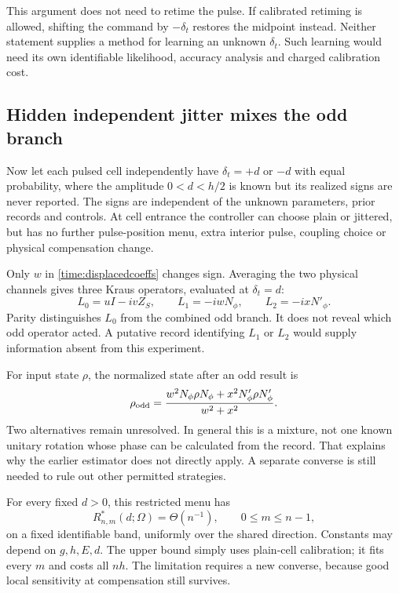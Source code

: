 \documentclass[11pt,a4paper]{article}
\numberwithin{equation}{section}
\theoremstyle{remark}
\begin{document}
This argument does not need to retime the pulse. If calibrated retiming is
allowed, shifting the command by $-\delta_t$ restores the midpoint instead.
Neither statement supplies a method for learning an unknown $\delta_t$.
Such learning would need its own identifiable likelihood, accuracy analysis
and charged calibration cost.

\subsection{Hidden independent jitter mixes the odd branch}

Now let each pulsed cell independently have $\delta_t=+d$ or $-d$ with equal
probability, where the amplitude $0<d<h/2$ is known but its realized signs are
never reported. The signs are independent of the unknown parameters, prior
records and controls. At cell entrance the controller can choose plain or
jittered, but has no further pulse-position menu, extra interior pulse,
coupling choice or physical compensation change.

Only $w$ in \eqref{time:displacedcoeffs} changes sign. Averaging the two
physical channels gives three Kraus operators, evaluated at $\delta_t=d$:
\begin{equation}
 L_0=uI-ivZ_S,\qquad L_1=-iwN_\phi,\qquad L_2=-ixN'_\phi.
 \label{time:jitterkraus}
\end{equation}
Parity distinguishes $L_0$ from the combined odd branch. It does not reveal
which odd operator acted. A putative record identifying $L_1$ or $L_2$ would
supply information absent from this experiment.

For input state $\rho$, the normalized state after an odd result is
\begin{equation}
 \rho_{\rm odd}=
 \frac{w^2N_\phi\rho N_\phi+x^2N'_\phi\rho N'_\phi}{w^2+x^2}.
\end{equation}
Two alternatives remain unresolved. In general this is a mixture, not one
known unitary rotation whose phase can be calculated from the record.
That explains why the earlier estimator does not directly apply. A separate
converse is still needed to rule out other permitted strategies.

For every fixed $d>0$, this restricted menu has
\begin{equation}
 R_{n,m}^{*}(d;\Omega)=\Theta(n^{-1}),
 \qquad 0\le m\le n-1,
 \label{time:jitterrisk}
\end{equation}
on a fixed identifiable band, uniformly over the shared direction. Constants
may depend on $g,h,E,d$. The upper bound simply uses plain-cell calibration;
it fits every $m$ and costs all $nh$. The limitation requires a new converse,
because good local sensitivity at compensation still survives.
\end{document}
